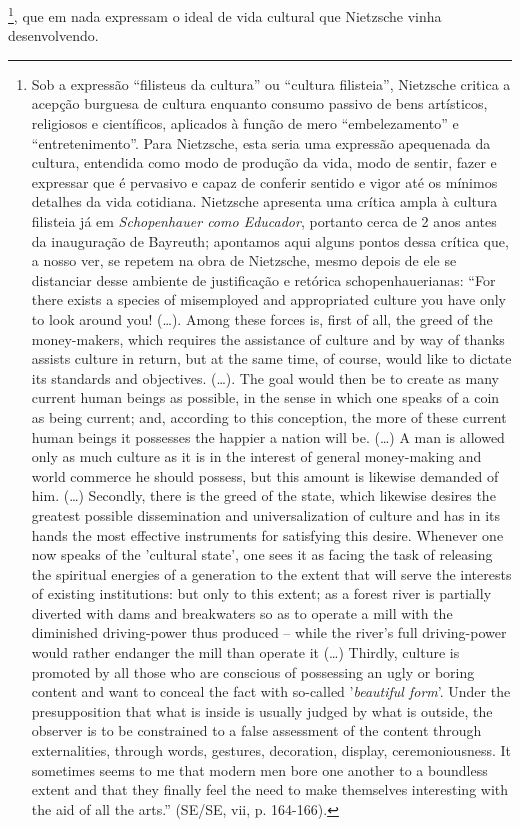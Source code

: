 \documentclass[
	12pt,				%
	openright,			%
	oneside,			%
	a4paper,			%
	english,			%
	french,				%
	spanish,			%
	brazil				%
	]{abntex2}
\begin{document}
\footnote{Sob a expressão “filisteus da cultura” ou “cultura filisteia”, Nietzsche critica a acepção burguesa de cultura enquanto consumo passivo de bens artísticos, religiosos e científicos, aplicados à função de mero “embelezamento” e “entretenimento”. Para Nietzsche, esta seria uma expressão apequenada da cultura, entendida como modo de produção da vida, modo de sentir, fazer e expressar que é pervasivo e capaz de conferir sentido e vigor até os mínimos detalhes da vida cotidiana. Nietzsche apresenta uma crítica ampla à cultura filisteia já em \textit{Schopenhauer como Educador}, portanto cerca de 2 anos antes da inauguração de Bayreuth; apontamos aqui alguns pontos dessa crítica que, a nosso ver, se repetem na obra de Nietzsche, mesmo depois de ele se distanciar desse ambiente de justificação e retórica schopenhauerianas: “For there exists a species of misemployed and appropriated culture you have only to look around you! (…). Among these forces is, first of all, the greed of the money-makers, which requires the assistance of culture and by way of thanks assists culture in return, but at the same time, of course, would like to dictate its standards and objectives. (…). The goal would then be to create as many current human beings as possible, in the sense in which one speaks of a coin as being current; and, according to this conception, the more of these current human beings it possesses the happier a nation will be. (…) A man is allowed only as much culture as it is in the interest of general money-making and world commerce he should possess, but this amount is likewise demanded of him. (…) Secondly, there is the greed of the state, which likewise desires the greatest possible dissemination and universalization of culture and has in its hands the most effective instruments for satisfying this desire. Whenever one now speaks of the 'cultural state', one sees it as facing the task of releasing the spiritual energies of a generation to the extent that will serve the interests of existing institutions: but only to this extent; as a forest river is partially diverted with dams and breakwaters so as to operate a mill with the diminished driving-power thus produced – while the river's full driving-power would rather endanger the mill than operate it (…) Thirdly, culture is promoted by all those who are conscious of possessing an ugly or boring content and want to conceal the fact with so-called '\textit{beautiful form}'. Under the presupposition that what is inside is usually judged by what is outside, the observer is to be constrained to a false assessment of the content through externalities, through words, gestures, decoration, display, ceremoniousness. It sometimes seems to me that modern men bore one another to a boundless extent and that they finally feel the need to make themselves interesting with the aid of all the arts.” (SE/SE, vii, p. 164-166).}, 
que em nada expressam o ideal de vida cultural que Nietzsche vinha desenvolvendo.
\end{document}
